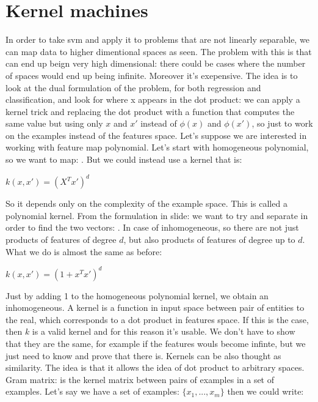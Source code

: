 \chapter{Kernel machines}
In order to take svm and apply it to problems that are not linearly separable, we can map data to higher dimentional spaces as seen. The problem with this is that can end up beign very high dimensional: there could be cases where the number of spaces would end up being infinite. Moreover it's exepensive. The idea is to look at the dual formulation of the problem, for both regression and classification, and look for where x appears in the dot product: we can apply a kernel trick and replacing the dot product with a function that computes the same value but using only $x$ and $x'$ instead of $\phi(x)$ and $\phi(x')$, so just to work on the examples instead of the features space. \newline
Let's suppose we are interested in working with feature map polynomial. Let's start with homogeneous polynomial, so we want to map: . But we could instead use a kernel that is:
\begin{center}
	$\displaystyle k(x,x')=(X^Tx')^d$
\end{center}
So it depends only on the complexity of the example space. This is called a polynomial kernel. From the formulation in slide: we want to try and separate in order to find the two vectors: . 
In case of inhomogeneous, so there are not just products of features of degree $d$, but also products of features of degree up to $d$. What we do is almost the same as before:
\begin{center}
	$\displaystyle k(x, x')=(1+x^Tx')^d$
\end{center}
Just by adding 1 to the homogeneous polynomial kernel, we obtain an inhomogeneous. \newline
A kernel is a function in input space between pair of entities to the real, which corresponds to a dot product in features space. If this is the case, then $k$ is a valid kernel and for this reason it's usable. We don't have to show that they are the same, for example if the features wouls become infinte, but we just need to know and prove that there is. \newline
Kernels can be also thought as similarity. The idea is that it allows the idea of dot product to arbitrary spaces. \newline
Gram matrix: is the kernel matrix between pairs of examples in a set of examples. Let's say we have a set of examples: $\{x_1, ..., x_m\}$ then we could write:
